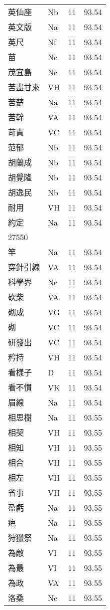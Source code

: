 \documentclass[twocolumn]{book}
\begin{document}
\begin{supertabular}{llrr}
英仙座 & Nb & 11 &  93.54\\
英文版 & Na & 11 &  93.54\\
英尺 & Nf & 11 &  93.54\\
苗 & Nc & 11 &  93.54\\
茂宜島 & Nc & 11 &  93.54\\
苦盡甘來 & VH & 11 &  93.54\\
苦楚 & Na & 11 &  93.54\\
苦幹 & VA & 11 &  93.54\\
苛責 & VC & 11 &  93.54\\
范郁 & Nb & 11 &  93.54\\
胡蘭成 & Nb & 11 &  93.54\\
胡覺隆 & Nb & 11 &  93.54\\
胡逸民 & Nb & 11 &  93.54\\
耐用 & VH & 11 &  93.54\\
約定 & Na & 11 &  93.54\\
27550\\
竿 & Na & 11 &  93.54\\
穿針引線 & VA & 11 &  93.54\\
科學界 & Nc & 11 &  93.54\\
砍柴 & VA & 11 &  93.54\\
砌成 & VG & 11 &  93.54\\
砌 & VC & 11 &  93.54\\
研發出 & VC & 11 &  93.54\\
矜持 & VH & 11 &  93.54\\
看樣子 & D & 11 &  93.54\\
看不慣 & VK & 11 &  93.54\\
眉線 & Na & 11 &  93.54\\
相思樹 & Na & 11 &  93.55\\
相契 & VH & 11 &  93.55\\
相知 & VH & 11 &  93.55\\
相合 & VH & 11 &  93.55\\
相左 & VH & 11 &  93.55\\
省事 & VH & 11 &  93.55\\
盈虧 & Na & 11 &  93.55\\
疤 & Na & 11 &  93.55\\
狩獵祭 & Na & 11 &  93.55\\
為敵 & VI & 11 &  93.55\\
為最 & VI & 11 &  93.55\\
為政 & VA & 11 &  93.55\\
洛桑 & Nc & 11 &  93.55\\

\end{supertabular}
\end{document}
